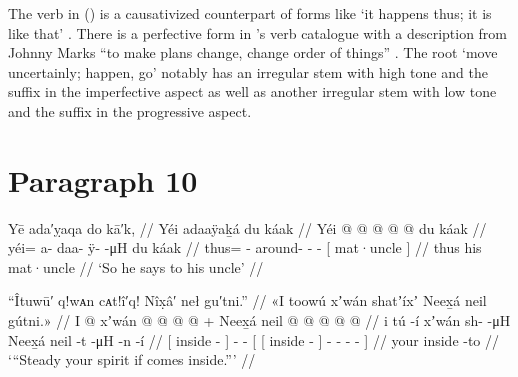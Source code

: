 The verb  in (\lastx) is a causativized counterpart of forms like  ‘it happens thus; it is like that’ \parencite[03/97]{leer:1973}.
There is a perfective form  in \citeauthor{leer:1976}’s verb catalogue with a description from Johnny Marks “to make plans change, change order of things” \parencite[187]{leer:1976}.
The root  ‘move uncertainly; happen, go’ notably has an irregular stem  with high tone and the  suffix in the imperfective aspect as well as another irregular stem  with low tone and the  suffix in the progressive aspect.


\section{Paragraph 10}\label{sec:91-para-10}

\ex\label{ex:91-97-says-to-uncle}%
%
\begingl
	\glpreamble	Yē ada′ỵaqa do kā′k, //
	\glpreamble	Yéi adaaÿaḵá du káak //
	\gla	Yéi @  @ {} @ {} @ {} @ {}
		{} du káak {} //
	\glb	yéi= a- daa- ÿ-  -μH
		{} du káak {} //
	\glc	thus= - around- -  -
		{}[  mat·uncle {}] //
	\gld	thus  {} {} {} {}
		{} his mat·uncle {} //
	\glft	‘So he says to his uncle’
		//
\endgl
\xe

\ex\label{ex:91-98-steady-spirit-neexha-comes}%
%
\begingl
	\glpreamble	“Îtuwū′ q!wᴀn cᴀt!î′q!
Nîx̣â′ neł gu′tni.” //
	\glpreamble	«\!I toowú xʼwán shatʼíxʼ Neex̱á neil gútni.\!» //
	\gla	{} I  @ {} {} xʼwán
		 @ {} @ {} @ {} @ {} +
		{} Neex̱á {} neil @ {} {}
			 @ {} @ {} @ {} @ {} {} //
	\glb	{} i tú -í {} xʼwán
		{} {} sh-  -μH
		{} Neex̱á {} neil -t {}
			{}  -μH -n -í {}  //
	\glc	{}[  inside - {}] 
		\· \· -  -
		{}[  {}[ inside - {}]
			-  - - - {}] //
	\gld	{} your  {} {} 
		 {} {} {} {}
		{}  {} inside -to {}
			 {} {} {} {} {} //
	\glft	‘“Steady your spirit if  comes inside.”’
		//
\endgl
\xe

